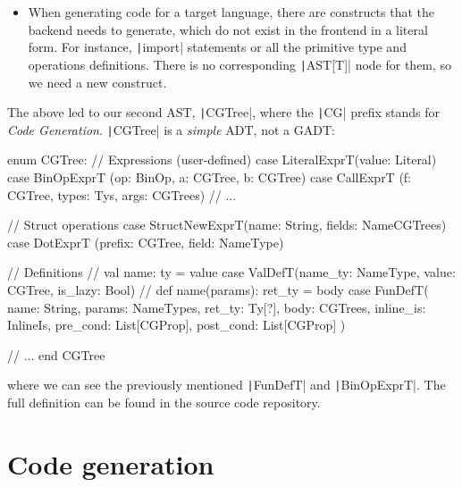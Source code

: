 \documentclass[11pt]{article}
\newcommand{\ScalaI}[1]{\texttt|#1|}
\newcommand{\textsfi}[1]{\textsf{\textit{#1}}}
\begin{document}
\begin{itemize}
  \item When generating code for a target language, there are constructs that 
  the backend needs to generate, which do not exist in the frontend in a 
  literal form. For instance, \ScalaI{import} statements or all the primitive 
  type and operations definitions. There is no corresponding \ScalaI{AST[T]} 
  node for them, so we need a new construct.
\end{itemize}
 
\noindent The above led to our second AST, \ScalaI{CGTree}, where the 
\ScalaI{CG} prefix stands for \textit{Code Generation}. \ScalaI{CGTree} is a 
\textit{simple} ADT, not a GADT:

\begin{ScalaBlockSimple}
enum CGTree:
  // Expressions (user-defined)
  case LiteralExprT(value: Literal)
  case BinOpExprT  (op: BinOp,   a: CGTree, b: CGTree)
  case CallExprT   (f: CGTree, types: Tys, args: CGTrees)
  // ...

  // Struct operations
  case StructNewExprT(name: String, fields: NameCGTrees)
  case DotExprT      (prefix: CGTree, field: NameType)
  
  // Definitions
  // val name: ty = value 
  case ValDefT(name_ty: NameType, value: CGTree, is_lazy: Bool)
  // def name(params): ret_ty = body
  case FunDefT(
    name: String,
    params: NameTypes,
    ret_ty: Ty[?],
    body: CGTrees,
    inline_is: InlineIs,
    pre_cond: List[CGProp],
    post_cond: List[CGProp]
  )

  // ...
end CGTree
\end{ScalaBlockSimple}

\noindent where we can see the previously mentioned \ScalaI{FunDefT} and 
\ScalaI{BinOpExprT}. The full definition can be found in the source code 
repository.

\section{Code generation}
\label{sec:code:gen}

\newcommand{\codeIN}{\ensuremath{\textsfi{code}_\textsfi{IN}}\xspace}
\newcommand{\codeOUT}{\ensuremath{\textsfi{code}_\textsfi{OUT}}\xspace}
\newcommand{\visitorAST}{\ensuremath{\textsfi{Visitor}_\textsfi{AST[T]}}\xspace}
\newcommand{\visitorCGTree}{\ensuremath{\textsfi{Visitor}_\textsfi{CGTree}}\xspace}
\end{document}

